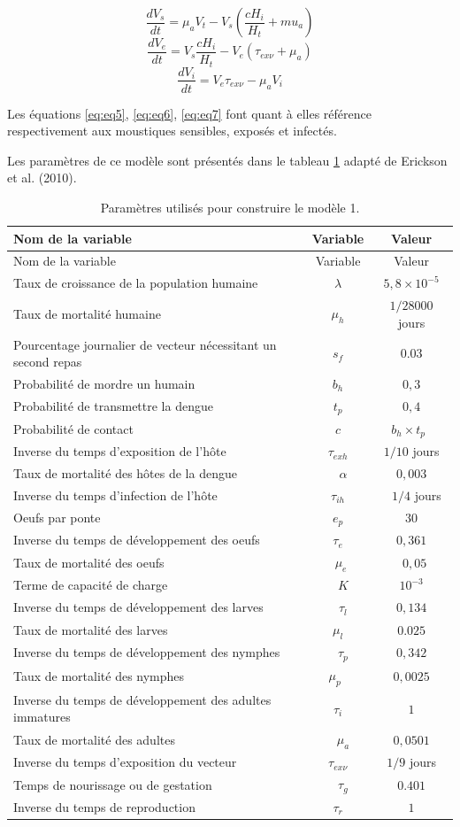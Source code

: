 \documentclass[
  12pt,
  french,
  oneside]{article}
\begin{document}
\begin{equation} \frac{dV_s}{dt} = \mu_aV_t - V_s \left(\frac{cH_i}{H_t} + mu_a\right)\label{eq:eq5}\end{equation}
\begin{equation} \frac{dV_e}{dt} = V_s \frac{cH_i}{H_t} - V_e \left(\tau_{ex\nu} + \mu_a\right)\label{eq:eq6}\end{equation}
\begin{equation} \frac{dV_i}{dt} = V_e\tau_{ex\nu} - \mu_aV_i \label{eq:eq7}\end{equation}

Les équations \ref{eq:eq5}, \ref{eq:eq6}, \ref{eq:eq7} font quant à
elles référence respectivement aux moustiques sensibles, exposés et
infectés.

Les paramètres de ce modèle sont présentés dans le tableau
\ref{tbl:tab1} adapté de Erickson et al. (2010).

\begin{longtable}[]{@{}lcc@{}}
\caption{Paramètres utilisés pour construire le modèle 1.
\label{tbl:tab1}}\tabularnewline
\toprule
Nom de la variable & Variable & Valeur\tabularnewline
\midrule
\endfirsthead
\toprule
Nom de la variable & Variable & Valeur\tabularnewline
\midrule
\endhead
Taux de croissance de la population humaine & \(\lambda\) &
\(5,8\times 10^{-5}\)\tabularnewline
Taux de mortalité humaine & \(\mu_h\) & \(1/28000\) jours\tabularnewline
Pourcentage journalier de vecteur nécessitant un second repas & \(s_f\)
& \(0.03\)\tabularnewline
Probabilité de mordre un humain & \(b_h\) & \(0,3\)\tabularnewline
Probabilité de transmettre la dengue & \(t_p\) & \(0,4\)\tabularnewline
Probabilité de contact & \(c\) & \(b_h \times t_p\)~\tabularnewline
Inverse du temps d'exposition de l'hôte & \(\tau_{exh}\) & \(1/10\)
jours\tabularnewline
Taux de mortalité des hôtes de la dengue & ~ \(\alpha\) &
\(0,003\)\tabularnewline
Inverse du temps d'infection de l'hôte & \(\tau_{ih}\) & ~ \(1/4\)
jours\tabularnewline
Oeufs par ponte & \(e_p\) & \(30\)\tabularnewline
Inverse du temps de développement des oeufs & \(\tau_e\) &
\(0,361\)\tabularnewline
Taux de mortalité des oeufs & ~\(\mu_e\) & ~\(0,05\)\tabularnewline
Terme de capacité de charge & ~ \(K\) & \(10^{-3}\)\tabularnewline
Inverse du temps de développement des larves & ~ \(\tau_l\) &
\(0,134\)\tabularnewline
Taux de mortalité des larves & \(\mu_l\) & \(0.025\)\tabularnewline
Inverse du temps de développement des nymphes & ~ \(\tau_p\) &
\(0,342\)\tabularnewline
Taux de mortalité des nymphes & \(\mu_p\)~ & \(0,0025\)\tabularnewline
Inverse du temps de développement des adultes immatures & \(\tau_i\) &
\(1\)\tabularnewline
Taux de mortalité des adultes & ~ \(\mu_a\) & \(0,0501\)\tabularnewline
Inverse du temps d'exposition du vecteur & \(\tau_{ex\nu}\) & \(1/9\)
jours\tabularnewline
Temps de nourissage ou de gestation & ~ \(\tau_g\) &
\(0.401\)\tabularnewline
Inverse du temps de reproduction & \(\tau_r\) & \(1\)\tabularnewline
\bottomrule
\end{longtable}
\end{document}
